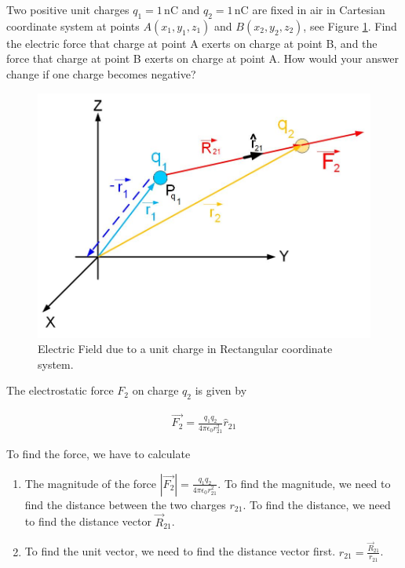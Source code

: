 \documentclass{ximera}
\begin{document}
\begin{example} 
Two positive unit charges $q_1=1$\,nC and $q_2=1$\,nC are fixed in air in Cartesian coordinate system at points $A(x_1,y_1,z_1)$ and $B(x_2,y_2,z_2)$, see Figure \ref{FigTwoCharges}. Find the electric force that charge at point A exerts on charge at point B, and the force that charge at point B exerts on charge at point A. How would your answer change if one charge becomes negative? 



\begin{figure}[htbp]
\begin{center}
\includegraphics[scale=0.5]{../jpg/twochargecartcoordFORCE.jpg}
\end{center}
\caption{Electric Field due to a unit charge in Rectangular coordinate system.}
\label{FigTwoCharges}
\end{figure}

\begin{explanation}

The electrostatic force $F_2$ on charge $q_2$ is given by 




\begin{eqnarray}
\vec{F_2}=\frac{q_1 q_2}{4 \pi \epsilon_0 r_{21}^2} \hat{r}_{21}
\end{eqnarray}

 To find the force, we have to calculate

\begin{enumerate} 
\item The magnitude of the force $|\vec{F_2}|=\frac{q_1 q_2}{4 \pi \epsilon_0 r_{21}^2}$. To find the magnitude, we need to find the distance between the two charges $r_{21}$. To find the distance, we need to find the distance vector $\vec{R}_{21}$. 
\item To find the unit vector, we need to find the distance vector first. $\hat{r}_{21}=\frac{\vec{R}_{21}}{r_{21}}$.
\end{enumerate}


\end{explanation}
\end{example}
\end{document}
